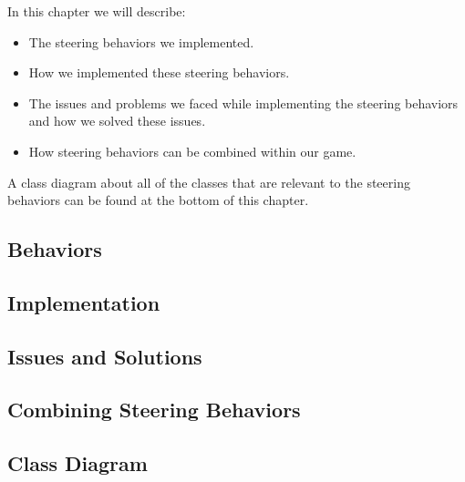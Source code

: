 In this chapter we will describe: 
\begin{itemize}
	\item The steering behaviors we implemented.
	\item How we implemented these steering behaviors.
	\item The issues and problems we faced while implementing the steering behaviors and how we solved these issues.
	\item How steering behaviors can be combined within our game.
\end{itemize}
A class diagram about all of the classes that are relevant to the steering behaviors can be found at the bottom of this chapter.
\subsection{Behaviors}
\subsection{Implementation}
\subsection{Issues and Solutions}
\subsection{Combining Steering Behaviors}
\subsection{Class Diagram}